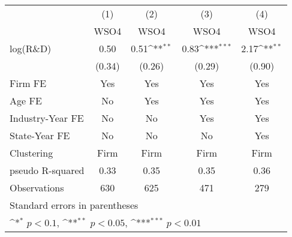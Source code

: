{
\def\sym#1{\ifmmode^{#1}\else\(^{#1}\)\fi}
\begin{tabular}{l*{4}{c}}
\toprule
                    &\multicolumn{1}{c}{(1)}&\multicolumn{1}{c}{(2)}&\multicolumn{1}{c}{(3)}&\multicolumn{1}{c}{(4)}\\
                    &\multicolumn{1}{c}{WSO4}&\multicolumn{1}{c}{WSO4}&\multicolumn{1}{c}{WSO4}&\multicolumn{1}{c}{WSO4}\\
\midrule
log(R\&D)           &        0.50         &        0.51\sym{**} &        0.83\sym{***}&        2.17\sym{**} \\
                    &      (0.34)         &      (0.26)         &      (0.29)         &      (0.90)         \\
\addlinespace
Firm FE             &         Yes         &         Yes         &         Yes         &         Yes         \\
\addlinespace
Age FE              &          No         &         Yes         &         Yes         &         Yes         \\
\addlinespace
Industry-Year FE    &          No         &          No         &         Yes         &         Yes         \\
\addlinespace
State-Year FE       &          No         &          No         &          No         &         Yes         \\
\midrule
Clustering          &       Firm         &       Firm         &       Firm         &       Firm         \\
pseudo R-squared    &        0.33         &        0.35         &        0.35         &        0.36         \\
Observations        &         630         &         625         &         471         &         279         \\
\bottomrule
\multicolumn{5}{l}{\footnotesize Standard errors in parentheses}\\
\multicolumn{5}{l}{\footnotesize \sym{*} \(p<0.1\), \sym{**} \(p<0.05\), \sym{***} \(p<0.01\)}\\
\end{tabular}
}
